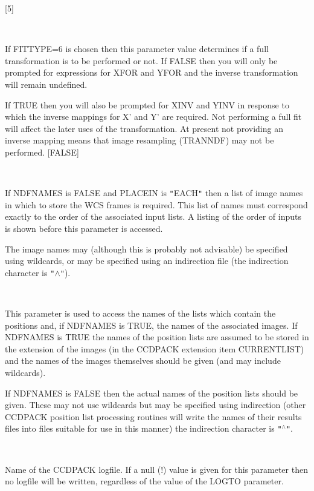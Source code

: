 \documentclass[twoside,11pt]{article}
\newcommand{\htmlref}[2]{#1}
\renewcommand{\_}{\texttt{\symbol{95}}}
\newcommand{\qt}[1]{{\tt "}#1{\tt "}}
\newcommand{\xroutine}[1]{\htmlref{{\sc #1}}{#1}}
\newcommand{\sstsubsection}[1]{ \item[{#1}] \mbox{} \\}
\newcommand{\sstsubsection}[1]{\item[{#1}]}
\begin{document}
{{{{         }
         [5]
      }
      \sstsubsection{
         FULL = \_LOGICAL (Read)
      } {
         If FITTYPE=6 is chosen then this parameter value determines
         if a full transformation is to be performed or not. If FALSE
         then you will only be prompted for expressions for XFOR and
         YFOR and the inverse transformation will remain undefined.

         If TRUE then you will also be prompted for XINV and YINV in
         response to which the inverse mappings for X' and Y' are
         required. Not performing a full fit will affect the later
         uses of the transformation. At present not providing an inverse
         mapping means that image resampling (\xroutine{TRANNDF}) may not be
         performed.
         [FALSE]
      }
      \sstsubsection{
         IN = LITERAL (Read)
      } {
         If NDFNAMES is FALSE and PLACEIN is \qt{EACH} then a list of image
         names in which to store the WCS frames is required.  This
         list of names must correspond  exactly to the order of the
         associated input lists. A listing of the order of inputs is
         shown before this parameter is accessed.

         The image names may (although this is probably not advisable)
         be specified using wildcards, or may be specified using an
         indirection file (the indirection character is {\tt "}$\wedge${\tt "}).
      }
      \sstsubsection{
         INLIST = LITERAL (Read)
      } {
         This parameter is used to access the names of the lists
         which contain the positions and, if NDFNAMES is TRUE, the names
         of the associated images. If NDFNAMES is TRUE the names of the
         position lists are assumed to be stored in the extension of the
         images (in the CCDPACK extension item CURRENT\_LIST) and the names
         of the images themselves should be given (and may include
         wildcards).

         If NDFNAMES is FALSE then the actual names of the position
         lists should be given. These may not use wildcards but may be
         specified using indirection (other CCDPACK position list
         processing routines will write the names of their results
         files into files suitable for use in this manner) the
         indirection character is \qt{$^\wedge$}.
      }
      \sstsubsection{
         LOGFILE = FILENAME (Read)
      } {
         Name of the CCDPACK logfile.  If a null (!) value is given for
         this parameter then no logfile will be written, regardless of
         the value of the LOGTO parameter.

}}}
\end{document}
